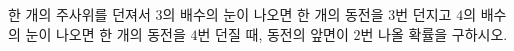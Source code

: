 한 개의 주사위를 던져서 $3$의 배수의 눈이 나오면 한 개의 동전을 $3$번 던지고 $4$의 배수의 눈이 나오면 한 개의 동전을 $4$번 던질 때, 동전의 앞면이 $2$번 나올 확률을 구하시오. 
